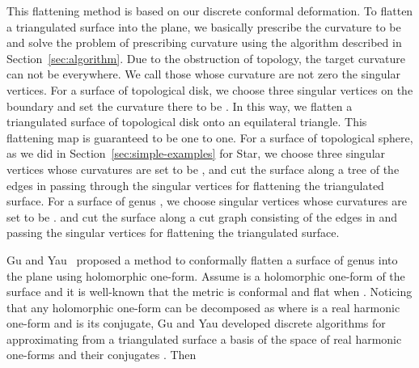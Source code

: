 \documentclass[11pt]{article}
\begin{document}
\vspace{0.1in}
This flattening method is based on our discrete conformal deformation. To flatten a triangulated surface
into the plane, we basically prescribe the curvature to be  and solve the problem of prescribing 
curvature using the algorithm described in Section~\ref{sec:algorithm}. Due to the obstruction of 
topology, the target curvature can not be  everywhere. We call those whose curvature are not zero 
the singular vertices. For a surface of topological disk, we choose three singular vertices on the boundary
and set the curvature there to be . In this way, we flatten a triangulated surface of topological
disk onto an equilateral triangle. This flattening map is guaranteed to be one to one. For a surface of 
topological sphere, as we did in Section~\ref{sec:simple-examples} for Star, we choose three singular 
vertices whose curvatures are set to be , and cut the surface along a tree of the edges in 
passing through the singular vertices for flattening the triangulated surface. 
For a surface of genus , we choose  singular vertices whose curvatures are set to be . 
and cut the surface along a cut graph consisting of the edges in  and passing the singular vertices 
for flattening the triangulated surface.  

\vspace{0.1in}
Gu and Yau~\cite{Gu:2003} proposed a method to conformally flatten a surface of 
genus  into the plane using holomorphic one-form. Assume  is a 
holomorphic one-form of the surface and it is well-known that the metric 
 is conformal and flat when . Noticing that 
any holomorphic one-form can be decomposed as 
where  is a real harmonic one-form and  is its conjugate, Gu and Yau 
developed discrete algorithms for approximating from a triangulated surface
a basis  of the space of real harmonic one-forms
and their conjugates . Then 
 
\end{document}
